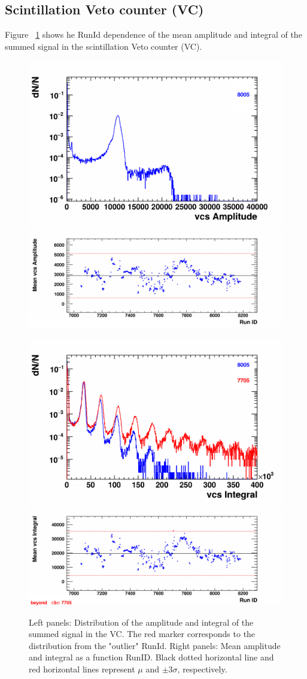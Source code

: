 \subsection{Scintillation Veto counter (VC)}

    Figure ~\ref{fig:VC} shows he RunId dependence of the mean amplitude and integral of the summed signal in the scintillation Veto counter (VC).    

    \begin{figure}[H]
        \begin{center}
            \includegraphics[width=0.35\linewidth]{../pict/QA_RunByRun_24.12/H1/nVtxTr_h2_RunId_vcsAmp.png}
            \includegraphics[width=0.60\linewidth]{../pict/QA_RunByRun_24.12/nVtxTr_h2_RunId_vcsAmp.png}

            \includegraphics[width=0.35\linewidth]{../pict/QA_RunByRun_24.12/H1/nVtxTr_h2_RunId_vcsInt.png}
            \includegraphics[width=0.60\linewidth]{../pict/QA_RunByRun_24.12/nVtxTr_h2_RunId_vcsInt.png}
            \vspace{-3mm}
            \caption{Left panels: Distribution of the amplitude and integral of the summed signal in the VC. The red marker corresponds to the distribution from the "outlier" RunId. Right panels: Mean amplitude and integral as a function RunID. Black dotted horizontal line and red horizontal lines represent $\mu$ and $\pm3\sigma$, respectively.}
            \label{fig:VC}
        \end{center}
        \vspace{-5mm}
    \end{figure}




